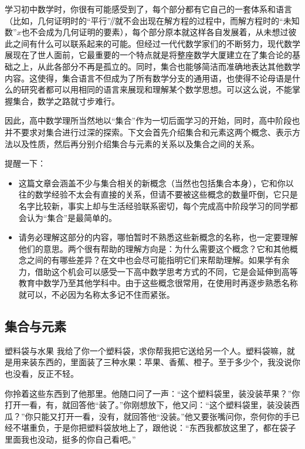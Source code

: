 
\begin{issues}
\issueDraft
\end{issues}


学习初中数学时，你很有可能感受到了，每个部分都有它自己的一套体系和语言（比如，几何证明时的“平行”$\mathbin{\!/\mkern-5mu/\!}$就不会出现在解方程的过程中，而解方程时的“未知数”$x$也不会成为几何证明的要素），每个部分原本就这样各自发展着，从未想过彼此之间有什么可以联系起来的可能。但经过一代代数学家们的不断努力，现代数学展现在了世人面前，它最重要的一个特点就是将整座数学大厦建立在了集合论的基础之上，从此各部分不再是孤立的。同时，集合也能够简洁而准确地表达其他数学内容。这使得，集合语言不但成为了所有数学分支的通用语，也使得不论母语是什么的研究者都可以用相同的语言来展现和理解某个数学思想。可以这么说，不能掌握集合，数学之路就寸步难行。

因此，高中数学理所当然地以“集合”作为一切后面学习的开始，同时，高中阶段也并不要求对集合进行过深的探索。下文会首先介绍集合和元素这两个概念、表示方法以及性质，然后再分别介绍集合与元素的关系以及集合之间的关系。

提醒一下：
\begin{itemize}
\item 这篇文章会涵盖不少与集合相关的新概念（当然也包括集合本身），它和你以往的数学经验不太会有直接的关系，但请不要被这些概念的数量吓倒，它只是名字比较新，事实上却与生活经验联系密切，每个完成高中阶段学习的同学都会认为“集合”是最简单的。
\item 请务必理解这部分的内容，哪怕暂时不熟悉这些新概念的名称，也一定要理解他们的意思。两个很有帮助的理解方向是：为什么需要这个概念？它和其他概念之间的有哪些差异？在文中也会尽可能指明它们来帮助理解。如果学有余力，借助这个机会可以感受一下高中数学思考方式的不同，它是会延伸到高等教育中数学乃至其他学科中。由于这些概念很常用，在使用时再逐步熟悉名称就可以，不必因为名称太多记不住而紧张。
\end{itemize}

\subsection{集合与元素}

\begin{example}{塑料袋与水果}
我给了你一个塑料袋，求你帮我把它送给另一个人。塑料袋嘛，就是用来装东西的，里面装了三种水果：苹果、香蕉、橙子。至于多少个，我没说你也没看，反正不轻。

你拎着这些东西到了他那里。他随口问了一声：“这个塑料袋里，装没装苹果？”你打开一看，有，就回答他“装了。”你刚想放下，他又问：“这个塑料袋里，装没装西瓜？”你只能又打开一看，没有，就回答他“没装。”他又要张嘴问你，奈何你的手已经不堪重负，于是你把塑料袋放地上了，跟他说：“东西我都放这里了，都在袋子里面我也没动，挺多的你自己看吧。”
\end{example}

